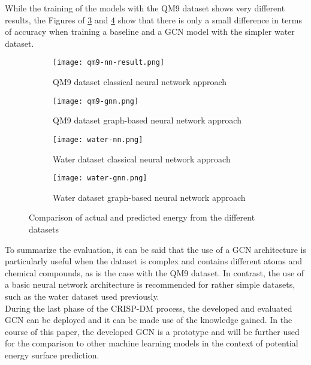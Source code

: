 While the training of the models with the QM9 dataset shows very different results, the Figures of \ref{fig:sfig3} and \ref{fig:sfig4} show that there is only a small difference in terms of accuracy when training a baseline and a GCN model with the simpler water dataset.


\begin{figure}[h!]
    \begin{subfigure}{.5\textwidth}
     \captionsetup{justification=centering}
      \centering
      \texttt{[image: qm9-nn-result.png]}
      \caption{QM9 dataset classical neural network approach}
      \label{fig:sfig1}
    \end{subfigure}%
    \begin{subfigure}{.5\textwidth}
      \centering
      \captionsetup{justification=centering}
      \texttt{[image: qm9-gnn.png]}
      \caption{QM9 dataset graph-based neural network approach}
      \label{fig:sfig2}
    \end{subfigure}
    \begin{subfigure}{.5\textwidth}
        \centering
        \captionsetup{justification=centering}
        \texttt{[image: water-nn.png]}
        \caption{Water dataset classical neural network approach}
        \label{fig:sfig3}
      \end{subfigure}
      \begin{subfigure}{.5\textwidth}
        \captionsetup{justification=centering}
        \centering
        \texttt{[image: water-gnn.png]}
        \caption{Water dataset graph-based neural network approach}
        \label{fig:sfig4}
      \end{subfigure}
    \caption{Comparison of actual and predicted energy from the different datasets}
    \label{fig:plotsofresults}
    \end{figure}

To summarize the evaluation, it can be said that the use of a GCN architecture is particularly useful when the dataset is complex and contains different atoms and chemical compounds, as is the case with the QM9 dataset. In contrast, the use of a basic neural network architecture is recommended for rather simple datasets, such as the water dataset used previously. \\

During the last phase of the CRISP-DM process, the developed and evaluated GCN can be deployed and it can be made use of the knowledge gained. In the course of this paper, the developed GCN is a prototype and will be further used for the comparison to other machine learning models in the context of potential energy surface prediction. 

